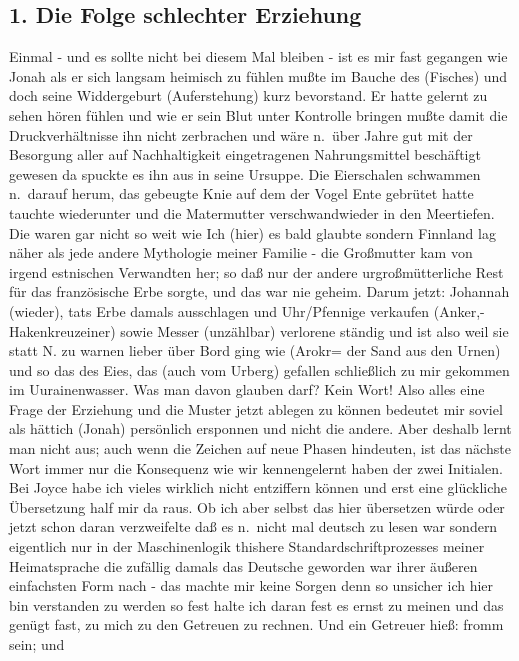 \documentclass[
]{article}
\author{}
\date{\vspace{-2.5em}}
\begin{document}
\subsection{1. Die Folge schlechter
Erziehung}\label{die-folge-schlechter-erziehung}

Einmal - und es sollte nicht bei diesem Mal bleiben - ist es mir fast
gegangen wie Jonah als er sich langsam heimisch zu fühlen mußte im
Bauche des (Fisches) und doch seine Widdergeburt (Auferstehung) kurz
bevorstand. Er hatte gelernt zu sehen hören fühlen und wie er sein Blut
unter Kontrolle bringen mußte damit die Druckverhältnisse ihn nicht
zerbrachen und wäre n.~über Jahre gut mit der Besorgung aller auf
Nachhaltigkeit eingetragenen Nahrungsmittel beschäftigt gewesen da
spuckte es ihn aus in seine Ursuppe. Die Eierschalen schwammen n.~darauf
herum, das gebeugte Knie auf dem der Vogel Ente gebrütet hatte tauchte
wiederunter und die Matermutter verschwandwieder in den Meertiefen. Die
waren gar nicht so weit wie Ich (hier) es bald glaubte sondern Finnland
lag näher als jede andere Mythologie meiner Familie - die Großmutter kam
von irgend estnischen Verwandten her; so daß nur der andere
urgroßmütterliche Rest für das französische Erbe sorgte, und das war nie
geheim. Darum jetzt: Johannah (wieder), tats Erbe damals ausschlagen und
Uhr/Pfennige verkaufen (Anker,- Hakenkreuzeiner) sowie Messer
(unzählbar) verlorene ständig und ist also weil sie statt N. zu warnen
lieber über Bord ging wie (Arokr= der Sand aus den Urnen) und so das des
Eies, das (auch vom Urberg) gefallen schließlich zu mir gekommen im
Uurainenwasser. Was man davon glauben darf? Kein Wort! Also alles eine
Frage der Erziehung und die Muster jetzt ablegen zu können bedeutet mir
soviel als hättich (Jonah) persönlich ersponnen und nicht die andere.
Aber deshalb lernt man nicht aus; auch wenn die Zeichen auf neue Phasen
hindeuten, ist das nächste Wort immer nur die Konsequenz wie wir
kennengelernt haben der zwei Initialen. Bei Joyce habe ich vieles
wirklich nicht entziffern können und erst eine glückliche Übersetzung
half mir da raus. Ob ich aber selbst das hier übersetzen würde oder
jetzt schon daran verzweifelte daß es n.~nicht mal deutsch zu lesen war
sondern eigentlich nur in der Maschinenlogik thishere
Standardschriftprozesses meiner Heimatsprache die zufällig damals das
Deutsche geworden war ihrer äußeren einfachsten Form nach - das machte
mir keine Sorgen denn so unsicher ich hier bin verstanden zu werden so
fest halte ich daran fest es ernst zu meinen und das genügt fast, zu
mich zu den Getreuen zu rechnen. Und ein Getreuer hieß: fromm sein; und
\end{document}
